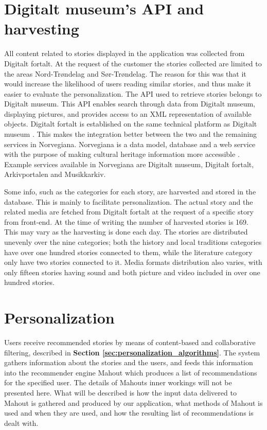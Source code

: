 \section{Digitalt museum's API and harvesting}
\label{sec:harvesting}

All content related to stories displayed in the application was collected from Digitalt fortalt. At the request of the customer the stories collected are limited to the areas Nord-Trøndelag and Sør-Trøndelag. The reason for this was that it would increase the likelihood of users reading similar stories, and thus make it easier to evaluate the personalization. The API \cite{digitaltMuseum} used to retrieve stories belongs to Digitalt museum. This API enables search through data from Digitalt museum, displaying pictures, and provides access to an XML representation of available objects. Digitalt fortalt is established on the same technical platform as Digitalt museum \cite{HM2}. This makes the integration better between the two and the remaining services in Norvegiana. Norvegiana is a data model, database and a web service with the purpose of making cultural heritage information more accessible \cite{HM3}. Example services available in Norvegiana are Digitalt museum, Digitalt fortalt, Arkivportalen and Musikkarkiv.\newline 

Some info, such as the categories for each story, are harvested and stored in the database. This is mainly to facilitate personalization. The actual story and the related media are fetched from Digitalt fortalt at the request of a specific story from front-end. At the time of writing the number of harvested stories is 169. This may vary as the harvesting is done each day. The stories are distributed unevenly over the nine categories; both the history and local traditions categories have over one hundred stories connected to them, while the literature category only have two stories connected to it. Media formats distribution also varies, with only fifteen stories having sound and both picture and video included in over one hundred stories.  

\section{Personalization}
\label{sec:personalization_how}

Users receive recommended stories by means of content-based and collaborative filtering, described in \textbf{Section \ref{sec:personalization_algorithms}}. The system gathers information about the stories and the users, and feeds this information into the recommender engine Mahout which produces a list of recommendations for the specified user. The details of Mahouts inner workings will not be presented here. What will be described is how the input data delivered to Mahout is gathered and produced by our application, what methods of Mahout is used and when they are used, and how the resulting list of recommendations is dealt with.\newline

